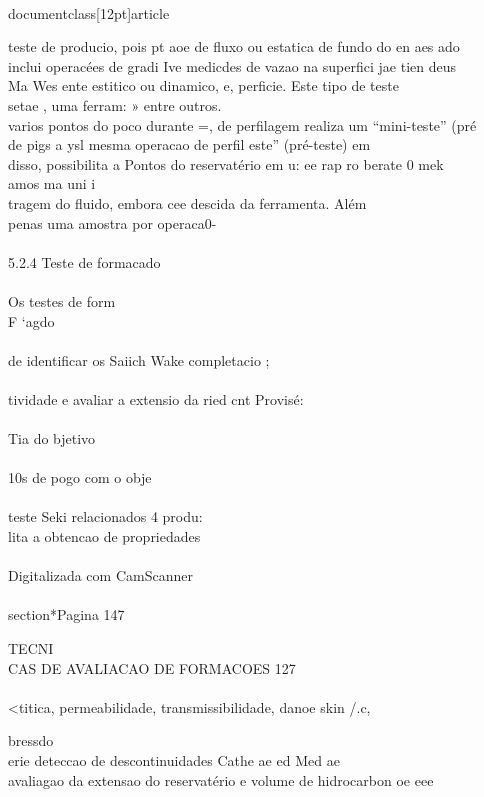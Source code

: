 \\documentclass[12pt]{article}
\begin{document}
{teste de producio, pois pt aoe de fluxo ou estatica de fundo do en aes ado\\
inclui operacées de gradi Ive medicdes de vazao na superfici jae tien deus\\
Ma Wes ente estitico ou dinamico, e, perficie. Este tipo de teste\\
setae , uma ferram: » entre outros.\\
varios pontos do poco durante =, de perfilagem realiza um “mini-teste” (pré\\
de pigs a ysl mesma operacao de perfil este” (pré-teste) em\\
disso, possibilita a Pontos do reservatério em u: ee rap ro berate 0 mek\\
amos ma uni i\\
tragem do fluido, embora cee descida da ferramenta. Além\\
penas uma amostra por operaca0-\\
\\
5.2.4 Teste de formacado\\
\\
Os testes de form\\
F ‘agdo\\
\\
de identificar os Saiich Wake completacio ;\\
\\
tividade e avaliar a extensio da ried cnt Provisé:\\
\\
Tia do bjetivo\\
\\
10s de pogo com o obje\\
\\
teste Seki relacionados 4 produ:\\
lita a obtencao de propriedades\\
\\
Digitalizada com CamScanner\\

\\section*{Pagina 147}

TECNI\\
CAS DE AVALIACAO DE FORMACOES 127\\
\\
<titica, permeabilidade, transmissibilidade, danoe skin /.c, \\} bressdo\\
erie deteccao de descontinuidades Cathe ae ed Med ae\\
avaliagao da extensao do reservatério e volume de hidrocarbon oe eee\\
\end{document}
